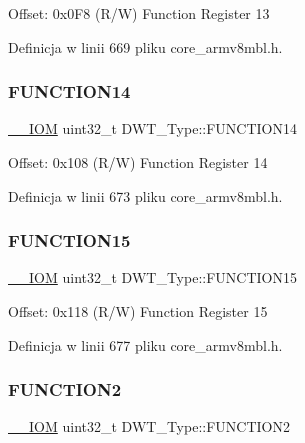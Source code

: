 Offset\+: 0x0\+F8 (R/W) Function Register 13 

Definicja w linii 669 pliku core\+\_\+armv8mbl.\+h.

\mbox{\label{struct_d_w_t___type_a85138a411459f923ea8e05312d70af71}} 
\subsubsection{\texorpdfstring{F\+U\+N\+C\+T\+I\+O\+N14}{FUNCTION14}}
{\footnotesize\ttfamily \hyperlink{core__sc300_8h_ab6caba5853a60a17e8e04499b52bf691}{\+\_\+\+\_\+\+I\+OM} uint32\+\_\+t D\+W\+T\+\_\+\+Type\+::\+F\+U\+N\+C\+T\+I\+O\+N14}

Offset\+: 0x108 (R/W) Function Register 14 

Definicja w linii 673 pliku core\+\_\+armv8mbl.\+h.

\mbox{\label{struct_d_w_t___type_a6e5fda09de44dfcd3e177c16028ceb74}} 
\subsubsection{\texorpdfstring{F\+U\+N\+C\+T\+I\+O\+N15}{FUNCTION15}}
{\footnotesize\ttfamily \hyperlink{core__sc300_8h_ab6caba5853a60a17e8e04499b52bf691}{\+\_\+\+\_\+\+I\+OM} uint32\+\_\+t D\+W\+T\+\_\+\+Type\+::\+F\+U\+N\+C\+T\+I\+O\+N15}

Offset\+: 0x118 (R/W) Function Register 15 

Definicja w linii 677 pliku core\+\_\+armv8mbl.\+h.

\mbox{\label{struct_d_w_t___type_ab1b60d6600c38abae515bab8e86a188f}} 
\subsubsection{\texorpdfstring{F\+U\+N\+C\+T\+I\+O\+N2}{FUNCTION2}}
{\footnotesize\ttfamily \hyperlink{core__sc300_8h_ab6caba5853a60a17e8e04499b52bf691}{\+\_\+\+\_\+\+I\+OM} uint32\+\_\+t D\+W\+T\+\_\+\+Type\+::\+F\+U\+N\+C\+T\+I\+O\+N2}


